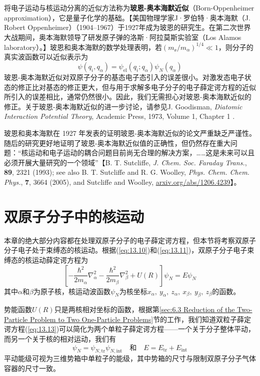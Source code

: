     将电子运动与核运动分离的近似方法称为\textbf{玻恩-奥本海默近似}（Born-Oppenheimer approximation），它是量子化学的基础。【美国物理学家J·罗伯特·奥本海默（J. Robert Oppenheimer）（1904–1967）于1927年成为玻恩的研究生。在第二次世界大战期间，奥本海默领导了研发原子弹的洛斯·阿拉莫斯实验室（Los Alamos laboratory）。】玻恩和奥本海默的数学处理表明，若$\left(m_{\ee }/m_{\alpha}\right)^{1/4} \ll 1$，则分子的真实波函数可以近似表示为
    \begin{equation}
        \psi\left(q_{i}, q_{\alpha}\right)=\psi_{\text{el}}\left(q_{i} ; q_{\alpha}\right) \psi_{N}\left(q_{\alpha}\right)
        \label{eq:13.12}
    \end{equation}
    玻恩-奥本海默近似对双原子分子的基态电子态引入的误差很小。对激发态电子状态的修正比对基态的修正更大，但与用于求解多电子分子的电子薛定谔方程的近似所引入的误差相比，通常仍然很小。因此，我们无需担心对玻恩-奥本海默近似的修正。关于玻恩-奥本海默近似的进一步讨论，请参见J. Goodisman, \textit{Diatomic Interaction Potential Theory}, Academic Press, 1973, Volume 1, Chapter 1 .

    玻恩和奥本海默在 1927 年发表的证明玻恩-奥本海默近似的论文严重缺乏严谨性。随后的研究更好地证明了玻恩-奥本海默近似值的正确性，但仍然存在重大问题：“核运动和电子运动的耦合问题目前尚无合理的解决方案，……这是未来可以且必须开展大量研究的一个领域”【B. T. Sutcliffe, \textit{J. Chem. Soc. Faraday Trans.}, \textbf{89}, 2321 (1993); see also B. T. Sutcliffe and R. G. Woolley, \textit{Phys. Chem. Chem. Phys.}, \textbf{7}, 3664 (2005), and Sutcliffe and Woolley, \url{arxiv.org/abs/1206.4239}】。


\section{双原子分子中的核运动}
\label{sec:13.2 Nuclear Motion in Diatomic Molecules}

    本章的绝大部分内容都在处理双原子分子的电子薛定谔方程，但本节将考察双原子分子电子处于束缚态的核运动。根据(\ref{eq:13.10})和(\ref{eq:13.11})，双原子分子电子束缚态的核运动薛定谔方程为
    \begin{equation}
        \left[-\frac{\hbar^2}{2m_{\alpha}}\nabla_{\alpha}^2 - \frac{\hbar^2}{2m_{\beta}}\nabla_{\beta}^2 + U\left(R\right)\right]\psi_N = E\psi_N
        \label{eq:13.13}
    \end{equation}
    其中$\alpha$和$\beta$为原子核，核运动波函数$\psi_N$为核坐标$x_{\alpha},\:y_{\alpha},\:z_{\alpha},\:x_{\beta},\:y_{\beta},\:z_{\beta}$的函数。

    势能函数$U\left(R\right)$只是两核相对坐标的函数，根据第\ref{sec:6.3 Reduction of the Two-Particle Problem to Two One-Particle Problems}节的工作，我们知道双粒子薛定谔方程(\ref{eq:13.13})可以简化为两个单粒子薛定谔方程——一个关于分子整体平动，而另一个关于核的相对运动，我们有
    \begin{equation}
        \psi_{N} = \psi_{N,\text{tr}} \psi_{N,\text{int}} \quad \text{和} \quad E = E_{\text{tr}} + E_{\text{int}}
        \label{eq:13.14}
    \end{equation}
    平动能级可视为三维势箱中单粒子的能级，其中势箱的尺寸与限制双原子分子气体容器的尺寸一致。

